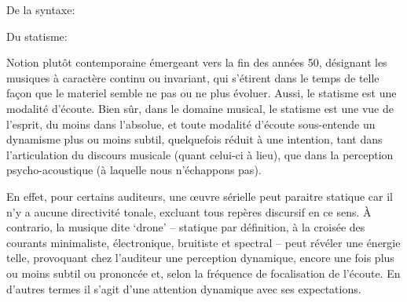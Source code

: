 \documentclass{article}
\begin{document}
\bigskip

De la syntaxe:

\smallskip


%
%

\bigskip

Du statisme:

\smallskip 

\noindent Notion plutôt contemporaine émergeant vers la fin des années 50, désignant les musiques à caractère continu ou invariant, qui s'étirent dans le temps de telle façon que le materiel semble ne pas ou ne plus évoluer.  Aussi, le statisme est une modalité d'écoute. 
Bien sûr, dans le domaine musical, le statisme est une vue de l'esprit, du moins dans l'absolue, et toute modalité d'écoute sous-entende un dynamisme plus ou moins subtil, quelquefois réduit à une intention, tant dans l'articulation du discours musicale (quant celui-ci à lieu), que dans la perception psycho-acoustique (à laquelle nous n'échappons pas).

En effet, pour certains auditeurs, une œuvre sérielle peut paraitre statique car il n'y a aucune directivité tonale, excluant tous repères discursif en ce sens. À contrario, la musique dite `drone'  -- statique par définition, à la croisée des courants minimaliste, électronique, bruitiste et spectral -- peut révéler une énergie telle, provoquant chez l'auditeur une perception dynamique, encore une fois plus ou moins subtil ou prononcée et, selon la fréquence de focalisation de l'écoute. En d'autres termes il s'agit d'une attention dynamique avec ses expectations.

\end{document}
